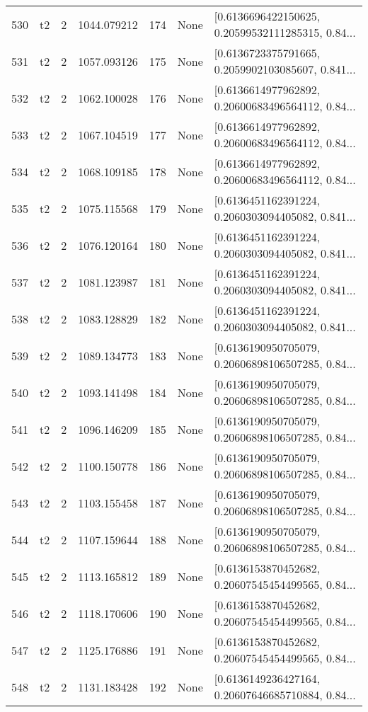 \begin{tabular}{lllrlll}
530 &  t2 &   2 &  1044.079212 &  174 &  None &  [0.6136696422150625, 0.20599532111285315, 0.84... \\
531 &  t2 &   2 &  1057.093126 &  175 &  None &  [0.6136723375791665, 0.2059902103085607, 0.841... \\
532 &  t2 &   2 &  1062.100028 &  176 &  None &  [0.6136614977962892, 0.20600683496564112, 0.84... \\
533 &  t2 &   2 &  1067.104519 &  177 &  None &  [0.6136614977962892, 0.20600683496564112, 0.84... \\
534 &  t2 &   2 &  1068.109185 &  178 &  None &  [0.6136614977962892, 0.20600683496564112, 0.84... \\
535 &  t2 &   2 &  1075.115568 &  179 &  None &  [0.6136451162391224, 0.2060303094405082, 0.841... \\
536 &  t2 &   2 &  1076.120164 &  180 &  None &  [0.6136451162391224, 0.2060303094405082, 0.841... \\
537 &  t2 &   2 &  1081.123987 &  181 &  None &  [0.6136451162391224, 0.2060303094405082, 0.841... \\
538 &  t2 &   2 &  1083.128829 &  182 &  None &  [0.6136451162391224, 0.2060303094405082, 0.841... \\
539 &  t2 &   2 &  1089.134773 &  183 &  None &  [0.6136190950705079, 0.20606898106507285, 0.84... \\
540 &  t2 &   2 &  1093.141498 &  184 &  None &  [0.6136190950705079, 0.20606898106507285, 0.84... \\
541 &  t2 &   2 &  1096.146209 &  185 &  None &  [0.6136190950705079, 0.20606898106507285, 0.84... \\
542 &  t2 &   2 &  1100.150778 &  186 &  None &  [0.6136190950705079, 0.20606898106507285, 0.84... \\
543 &  t2 &   2 &  1103.155458 &  187 &  None &  [0.6136190950705079, 0.20606898106507285, 0.84... \\
544 &  t2 &   2 &  1107.159644 &  188 &  None &  [0.6136190950705079, 0.20606898106507285, 0.84... \\
545 &  t2 &   2 &  1113.165812 &  189 &  None &  [0.6136153870452682, 0.20607545454499565, 0.84... \\
546 &  t2 &   2 &  1118.170606 &  190 &  None &  [0.6136153870452682, 0.20607545454499565, 0.84... \\
547 &  t2 &   2 &  1125.176886 &  191 &  None &  [0.6136153870452682, 0.20607545454499565, 0.84... \\
548 &  t2 &   2 &  1131.183428 &  192 &  None &  [0.6136149236427164, 0.20607646685710884, 0.84... \\

\end{tabular}
